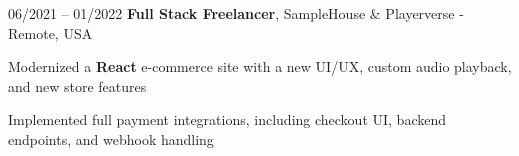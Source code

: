 

\begin{twocolentry}{
    06/2021 – 01/2022
}
\fontsize{11 pt}{11 pt}\textbf{Full Stack Freelancer}, SampleHouse \& Playerverse - Remote, USA\end{twocolentry}

\vspace{0.10 cm}
\begin{onecolentry}
   \begin{highlights}
       \item Modernized a \textbf{React} e-commerce site with a new UI/UX, custom audio playback, and new store features
       \item Implemented full payment integrations, including checkout UI, backend endpoints, and webhook handling
   \end{highlights}
\end{onecolentry}
